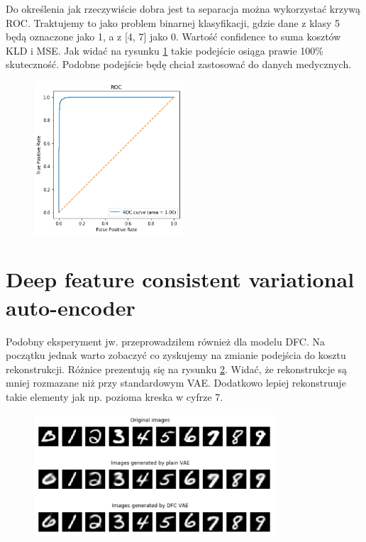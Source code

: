 Do określenia jak rzeczywiście dobra jest ta separacja można wykorzystać krzywą ROC. Traktujemy to jako problem binarnej klasyfikacji, gdzie dane z klasy 5 będą oznaczone jako 1, a z [4, 7] jako 0. Wartość confidence to suma kosztów KLD i MSE. Jak widać na rysunku \ref{fig:mnist_roc} takie podejście osiąga prawie 100\% skuteczność. Podobne podejście będę chciał zastosować do danych medycznych.

\begin{figure}[h!]
    \centering
    \includegraphics[width=0.5\textwidth]{images/mnist_roc}
    \caption{}
    \label{fig:mnist_roc}
\end{figure}

\section{Deep feature consistent variational auto-encoder}

Podobny eksperyment jw. przeprowadziłem również dla modelu DFC. Na początku jednak warto zobaczyć co zyskujemy na zmianie podejścia do kosztu rekonstrukcji. Różnice prezentują się na rysunku \ref{fig:vae_dfc_recon}. Widać, że rekonstrukcje są mniej rozmazane niż przy standardowym VAE. Dodatkowo lepiej rekonstruuje takie elementy jak np. pozioma kreska w cyfrze 7. 

\begin{figure}[h!]
    \centering
    \includegraphics[width=0.8\textwidth]{images/vae_dfc_gen}
    \caption{}
    \label{fig:vae_dfc_recon}
\end{figure}

